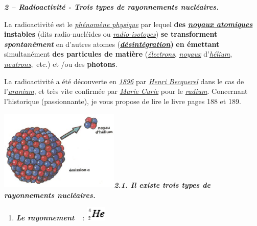 \emph{\textbf{2 -- Radioactivité - Trois types de rayonnements
nucléaires. }}

La radioactivité est le
\href{https://fr.wikipedia.org/wiki/Ph\%C3\%A9nom\%C3\%A8ne_physique}{\emph{\emph{phénomène
physique}}} par lequel \textbf{des
}\href{https://fr.wikipedia.org/wiki/Noyau_atomique}{\emph{\emph{\textbf{noyaux
atomiques}}}}\textbf{ instables} (dits radio-nucléides ou
\href{https://fr.wikipedia.org/wiki/Radioisotope}{\emph{\emph{radio-isotopes}}})
\textbf{se transforment }\emph{\textbf{spontanément}} en d'autres atomes
(\href{https://fr.wikipedia.org/wiki/D\%C3\%A9sint\%C3\%A9gration_radioactive}{\emph{\emph{\textbf{désintégration}}}}\textbf{)}
\textbf{en émettant} simultanément \textbf{des particules de matière}
(\href{https://fr.wikipedia.org/wiki/\%C3\%89lectron}{\emph{\emph{électrons}}},
\href{https://fr.wikipedia.org/wiki/Noyau_atomique}{\emph{\emph{noyaux}}}
d'\href{https://fr.wikipedia.org/wiki/H\%C3\%A9lium_4}{\emph{\emph{hélium}}},
\href{https://fr.wikipedia.org/wiki/Neutron}{\emph{\emph{neutrons}}},~etc.)
et /ou des \textbf{photons}.

La radioactivité a été découverte en
\href{https://fr.wikipedia.org/wiki/1896}{\emph{\emph{1896}}} par
\href{https://fr.wikipedia.org/wiki/Henri_Becquerel}{\emph{\emph{Henri
Becquerel}}} dans le cas de
l'\href{https://fr.wikipedia.org/wiki/Uranium}{\emph{\emph{uranium}}},
et très vite confirmée par
\href{https://fr.wikipedia.org/wiki/Marie_Curie}{\emph{\emph{Marie
Curie}}} pour le
\href{https://fr.wikipedia.org/wiki/Radium}{\emph{\emph{radium}}}.
Concernant l'historique (passionnante), je vous propose de lire le livre
pages 188 et 189.

\includegraphics[width=5.697cm,height=3.856cm]{Pictures/10000000000001E00000013EE6B5ED22BED582FE.jpg}\emph{\textbf{2.1.
Il existe trois types de rayonnements nucléaires. }}

\begin{enumerate}
\def\labelenumi{\alph{enumi})}
\tightlist
\item
  \emph{\textbf{Le rayonnement }\textbf{}}~:\textbf{
  }\includegraphics[width=0.966cm,height=0.683cm]{Pictures/100000010000001B00000013CE6DE589828DD379.png}
\end{enumerate}

